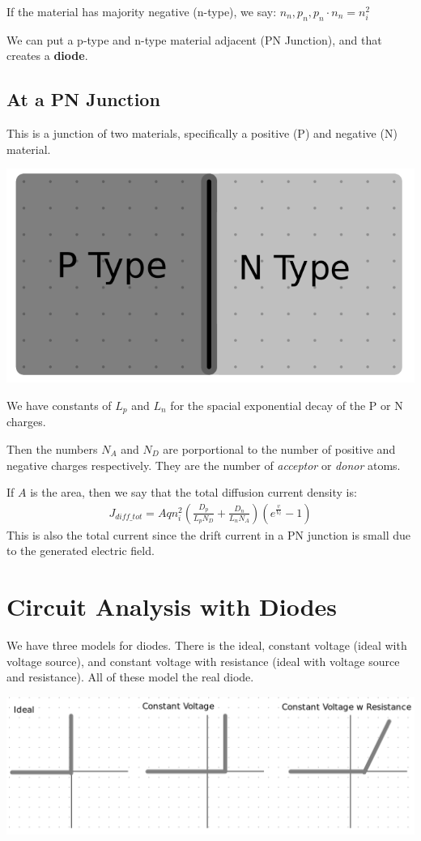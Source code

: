 \documentclass[12pt,letterpaper]{article} \usepackage{amsmath} \usepackage{graphicx} \usepackage[margin=1in]{geometry} \usepackage{longtable}  \usepackage{amssymb}
\begin{document}
	If the material has majority negative (n-type), we say: $n_n, p_n, p_n\cdot n_n = n_i^2$
	
	We can put a p-type and n-type material adjacent (PN Junction), and that creates a \textbf{diode}.
	
	\subsection{At a PN Junction}
	This is a junction of two materials, specifically a positive (P) and negative (N) material. 
	\begin{center}
		\includegraphics[width=0.23\linewidth]{pn-junction}
	\end{center}

	We have constants of $L_p$ and $L_n$ for the spacial exponential decay of the P or N charges. 
	
	Then the numbers $N_A$ and $N_D$ are porportional to the number of positive and negative charges respectively. They are the number of \textit{acceptor} or \textit{donor} atoms. 
	
	If $A$ is the area, then we say that the total diffusion current density is:
	\begin{align*}
		J_{diff\_tot} = Aqn_i^2\left(\frac{D_p}{L_pN_D}+\frac{D_n}{L_nN_A}\right)\left(e^{\frac{v}{V_t}}-1\right)
	\end{align*}
	This is also the total current since the drift current in a PN junction is small due to the generated electric field. 
	
	
	
	\section{Circuit Analysis with Diodes}
	We have three models for diodes. There is the ideal, constant voltage (ideal with voltage source), and constant voltage with resistance (ideal with voltage source and resistance). All of these model the real diode. 
	\begin{center}
		\includegraphics[width=0.8\linewidth]{diode-models}
	\end{center}
\end{document}
